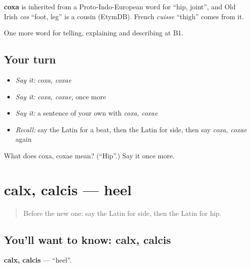 \begin{cousinweb}
\textbf{coxa} is inherited from a Proto-Indo-European word for \textquotedblleft{}hip, joint\textquotedblright{}, and Old Irish \emph{cos} \textquotedblleft{}foot, leg\textquotedblright{} is a cousin (EtymDB). French \emph{cuisse} \textquotedblleft{}thigh\textquotedblright{} comes from it.
\end{cousinweb}

\begin{grammarlens}[title={What you've built}]
One more word for telling, explaining and describing at B1.
\end{grammarlens}

\subsection*{Your turn}
\begin{itemize}
\raggedright
  \item \emph{Say it:} \emph{coxa, coxae}
  \item \emph{Say it:} \emph{coxa, coxae}, once more
  \item \emph{Say it:} a sentence of your own with \emph{coxa, coxae}
  \item \emph{Recall:} say the Latin for a beat, then the Latin for side, then say \emph{coxa, coxae} again
\end{itemize}

\begin{tcolorbox}[breakable,colback=teal!4,colframe=teal!35!black,title={Before you move on}]
What does coxa, coxae mean? (\textquotedblleft{}Hip\textquotedblright{}.) Say it once more.
\end{tcolorbox}
\section[calx, calcis]{calx, calcis — heel}

\label{lesson:LA-C518-calx}



\begin{quote}
Before the new one: say the Latin for side, then the Latin for hip.
\end{quote}

\subsection*{You'll want to know: calx, calcis}
\textbf{calx, calcis} — \textquotedblleft{}heel\textquotedblright{}.

